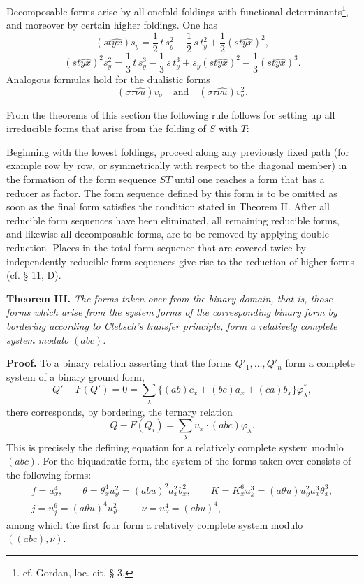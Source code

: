 \documentclass[11pt]{article}
\begin{document}
Decomposable forms arise by all onefold foldings with functional determinants\footnote{cf. Gordan, loc. cit. § 3.}, and moreover by certain higher foldings. One has
\[
(st\widehat{yx})s_y=\frac12\,t\,s_y^2-\frac12\,s\,t_y^2+\frac12(st\widehat{yx})^2,
\]
\[
(st\widehat{yx})^2s_y^2=\frac13\,t\,s_y^3-\frac13\,s\,t_y^3+s_y(st\widehat{yx})^2-\frac13(st\widehat{yx})^3.
\]
Analogous formulas hold for the dualistic forms
\[
(\sigma\tau\widehat{\nu u})v_\sigma
\quad\text{and}\quad
(\sigma\tau\widehat{\nu u})v_\sigma^2.
\]

From the theorems of this section the following rule follows for setting up all irreducible forms that arise from the folding of $S$ with $T$:

Beginning with the lowest foldings, proceed along any previously fixed path (for example row by row, or symmetrically with respect to the diagonal member) in the formation of the form sequence $ST$ until one reaches a form that has a reducer as factor. The form sequence defined by this form is to be omitted as soon as the final form satisfies the condition stated in Theorem II. After all reducible form sequences have been eliminated, all remaining reducible forms, and likewise all decomposable forms, are to be removed by applying double reduction. Places in the total form sequence that are covered twice by independently reducible form sequences give rise to the reduction of higher forms (cf. § 11, D).


\clearpage
\noindent\textbf{Theorem III.}
\emph{The forms taken over from the binary domain, that is, those forms which arise from the system forms of the corresponding binary form by bordering according to Clebsch's transfer principle, form a relatively complete system modulo $(abc)$.}

\noindent\textbf{Proof.}
To a binary relation asserting that the forms $Q'_1,\ldots,Q'_n$ form a complete system of a binary ground form,
\[
Q'-F(Q')=0=\sum_\lambda\bigl\{(ab)c_x+(bc)a_x+(ca)b_x\bigr\}\varphi_\lambda^{*},
\]
there corresponds, by bordering, the ternary relation
\[
Q-F(Q_i)=\sum_\lambda  u_x\cdot(abc)\varphi_\lambda  .
\]
This is precisely the defining equation for a relatively complete system modulo $(abc)$. For the biquadratic form, the system of the forms taken over consists of the following forms:
\[
\begin{gathered}
f=a_x^4,\qquad
\theta=\theta_x^4u_\vartheta^2=(abu)^2a_x^2b_x^2,\qquad
K=K_x^6u_k^3=(a\theta u)u_\vartheta^2a_x^3\theta_x^3,\\
j=u_j^6=(a\theta u)^4u_\vartheta^2,\qquad
\nu=u_\nu^4=(abu)^4,
\end{gathered}
\]
among which the first four form a relatively complete system modulo $((abc),\nu)$.
\end{document}
